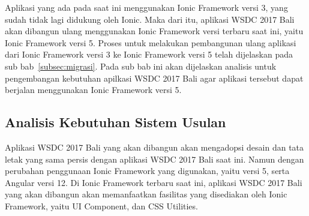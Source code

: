 Aplikasi yang ada pada saat ini menggunakan Ionic Framework versi 3, yang sudah tidak lagi didukung oleh Ionic. Maka dari itu, aplikasi WSDC 2017 Bali akan dibangun ulang  menggunakan Ionic Framework versi terbaru saat ini, yaitu Ionic Framework versi 5. Proses untuk melakukan pembangunan ulang aplikasi dari Ionic Framework versi 3 ke Ionic Framework versi 5 telah dijelaskan pada sub bab~\ref{subsec:migrasi}. Pada sub bab ini akan dijelaskan analisis untuk pengembangan kebutuhan apilkasi WSDC 2017 Bali agar aplikasi tersebut dapat berjalan menggunakan Ionic Framework versi 5.

\subsection{Analisis Kebutuhan Sistem Usulan}
\label{sec:analisisKebutuhanSistem}
Aplikasi WSDC 2017 Bali yang akan dibangun akan mengadopsi desain dan tata letak yang sama persis dengan aplikasi WSDC 2017 Bali saat ini. Namun dengan perubahan penggunaan Ionic Framework yang digunakan, yaitu versi 5, serta Angular versi 12. Di Ionic Framework terbaru saat ini, aplikasi WSDC 2017 Bali yang akan dibangun akan memanfaatkan fasilitas yang disediakan oleh Ionic Framework, yaitu UI Component, dan CSS Utilities. 

